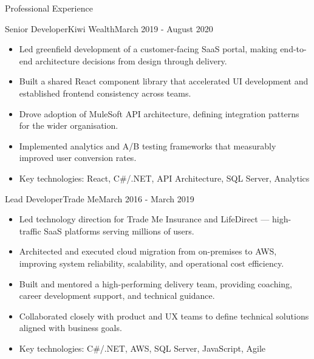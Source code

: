 \documentclass{mcdowellcv}
\begin{document}
\begin{cvsection}{Professional Experience}
    \begin{cvsubsection}{Senior Developer}{Kiwi Wealth}{March 2019 - August 2020}
        \begin{itemize}
            \item Led greenfield development of a customer-facing SaaS portal, making end-to-end architecture decisions from design through delivery.
            \item Built a shared React component library that accelerated UI development and established frontend consistency across teams.
            \item Drove adoption of MuleSoft API architecture, defining integration patterns for the wider organisation.
            \item Implemented analytics and A/B testing frameworks that measurably improved user conversion rates.
            \item Key technologies: React, C\#/.NET, API Architecture, SQL Server, Analytics
        \end{itemize}
    \end{cvsubsection}
    
    \begin{cvsubsection}{Lead Developer}{Trade Me}{March 2016 - March 2019}
        \begin{itemize}
            \item Led technology direction for Trade Me Insurance and LifeDirect --- high-traffic SaaS platforms serving millions of users.
            \item Architected and executed cloud migration from on-premises to AWS, improving system reliability, scalability, and operational cost efficiency.
            \item Built and mentored a high-performing delivery team, providing coaching, career development support, and technical guidance.
            \item Collaborated closely with product and UX teams to define technical solutions aligned with business goals.
            \item Key technologies: C\#/.NET, AWS, SQL Server, JavaScript, Agile
        \end{itemize}
    \end{cvsubsection}


\end{cvsection}
\end{document}
